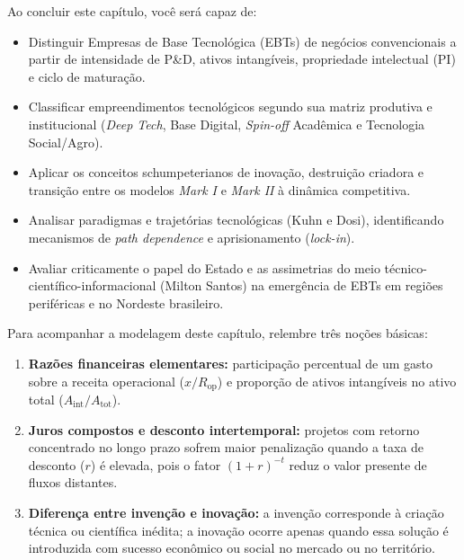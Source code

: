 \begin{capObjetivos}
Ao concluir este capítulo, você será capaz de:
\begin{itemize}[leftmargin=1.4em, itemsep=2pt]
  \item Distinguir Empresas de Base Tecnológica (EBTs) de negócios convencionais a partir de intensidade de P\&D, ativos intangíveis, propriedade intelectual (PI) e ciclo de maturação.
  \item Classificar empreendimentos tecnológicos segundo sua matriz produtiva e institucional (\textit{Deep Tech}, Base Digital, \textit{Spin-off} Acadêmica e Tecnologia Social/Agro).
  \item Aplicar os conceitos schumpeterianos de inovação, destruição criadora e transição entre os modelos \textit{Mark I} e \textit{Mark II} à dinâmica competitiva.
  \item Analisar paradigmas e trajetórias tecnológicas (Kuhn e Dosi), identificando mecanismos de \textit{path dependence} e aprisionamento (\textit{lock-in}).
  \item Avaliar criticamente o papel do Estado e as assimetrias do meio técnico-científico-informacional (Milton Santos) na emergência de EBTs em regiões periféricas e no Nordeste brasileiro.
\end{itemize}
\end{capObjetivos}

\begin{capRevisao}
Para acompanhar a modelagem deste capítulo, relembre três noções básicas:
\begin{enumerate}[leftmargin=1.4em, itemsep=2pt]
  \item \textbf{Razões financeiras elementares:} participação percentual de um gasto sobre a receita operacional ($x / R_{\text{op}}$) e proporção de ativos intangíveis no ativo total ($A_{\text{int}} / A_{\text{tot}}$).
  \item \textbf{Juros compostos e desconto intertemporal:} projetos com retorno concentrado no longo prazo sofrem maior penalização quando a taxa de desconto ($r$) é elevada, pois o fator $(1+r)^{-t}$ reduz o valor presente de fluxos distantes.
  \item \textbf{Diferença entre invenção e inovação:} a invenção corresponde à criação técnica ou científica inédita; a inovação ocorre apenas quando essa solução é introduzida com sucesso econômico ou social no mercado ou no território.
\end{enumerate}
\end{capRevisao}

